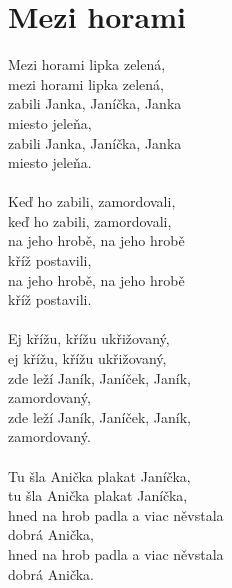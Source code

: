 \section{Mezi horami}
Mezi horami lipka zelená,\\
mezi horami lipka zelená,\\
zabili Janka, Janíčka, Janka\\
miesto jeleňa,\\
zabili Janka, Janíčka, Janka\\
miesto jeleňa.\\
\\
Keď ho zabili, zamordovali,\\
keď ho zabili, zamordovali,\\
na jeho hrobě, na jeho hrobě\\
kříž postavili,\\
na jeho hrobě, na jeho hrobě\\
kříž postavili.\\
\\
Ej křížu, křížu ukřižovaný,\\
ej křížu, křížu ukřižovaný,\\
zde leží Janík, Janíček, Janík,\\
zamordovaný,\\
zde leží Janík, Janíček, Janík,\\
zamordovaný.\\
\\
Tu šla Anička plakat Janíčka,\\
tu šla Anička plakat Janíčka,\\
hned na hrob padla a viac něvstala\\
dobrá Anička,\\
hned na hrob padla a viac něvstala\\
dobrá Anička.\\